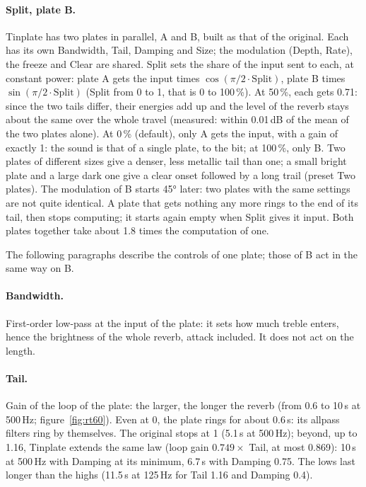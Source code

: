\documentclass[a4paper,11pt]{article}
\newcommand{\dB}{\,dB}
\begin{document}
\paragraph{Split, plate B.} Tinplate has two plates in parallel, A and B, built as that of the
original. Each has its own Bandwidth, Tail, Damping and Size; the modulation (Depth, Rate), the
freeze and Clear are shared. Split sets the share of the input sent to each, at constant
power: plate A gets the input times $\cos(\pi/2 \cdot \mathrm{Split})$, plate B times
$\sin(\pi/2 \cdot \mathrm{Split})$ (Split from 0 to 1, that is 0 to 100\,\%). At 50\,\%, each
gets 0.71: since the two tails differ, their energies add up and the level of the reverb stays
about the same over the whole travel (measured: within 0.01\dB{} of the mean of the two plates
alone). At 0\,\% (default), only A gets the input, with a gain of exactly 1: the sound is that
of a single plate, to the bit; at 100\,\%, only B. Two plates of different sizes give a denser,
less metallic tail than one; a small bright plate and a large dark one give a clear onset
followed by a long trail (preset Two plates). The modulation of B starts 45° later: two plates
with the same settings are not quite identical. A plate that gets nothing any more rings to the
end of its tail, then stops computing; it starts again empty when Split gives it input. Both
plates together take about 1.8 times the computation of one.

The following paragraphs describe the controls of one plate; those of B act in the same way on B.

\paragraph{Bandwidth.} First-order low-pass at the input of the plate: it sets how much treble
enters, hence the brightness of the whole reverb, attack included. It does not act on the
length.

\paragraph{Tail.} Gain of the loop of the plate: the larger, the longer the reverb (from 0.6
to 10\,s at 500\,Hz; figure~\ref{fig:rt60}). Even at 0, the plate rings for about 0.6\,s: its
allpass filters ring by themselves. The original stops at 1 (5.1\,s at 500\,Hz); beyond, up to
1.16, Tinplate extends the same law (loop gain $0.749 \times$ Tail, at most 0.869): 10\,s at
500\,Hz with Damping at its minimum, 6.7\,s with Damping 0.75. The lows last longer than the
highs (11.5\,s at 125\,Hz for Tail 1.16 and Damping 0.4).
\end{document}

